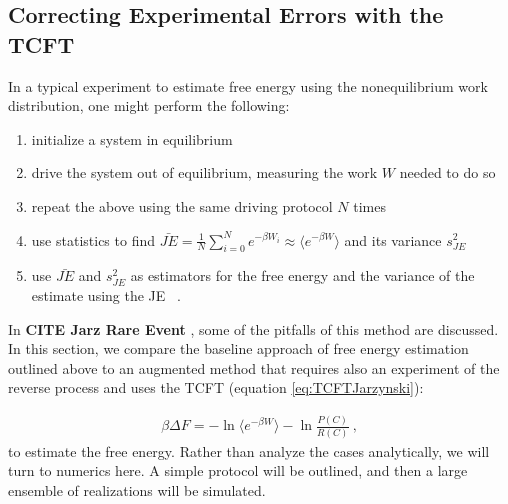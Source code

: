 \documentclass[paper=a4, fontsize=10pt]{article} %
\numberwithin{equation}{section} %
\numberwithin{figure}{section} %
\numberwithin{table}{section} %
\def\tbf #1{\textbf{#1} }
\def\avg#1{\langle #1 \rangle}
\begin{document}
\subsection{Correcting Experimental Errors with the TCFT}\label{sec:Corrections}

In a typical experiment to estimate free energy using the nonequilibrium work distribution, one might perform the following:
\begin{enumerate}
\item initialize a system in equilibrium
\item drive the system out of equilibrium, measuring the work $W$ needed to do so
\item repeat the above using the same driving protocol $N$ times
\item use statistics to find $ \bar{JE}  = \frac{1}{N} \sum_{i=0}^N e^{-\beta W_i} \approx \avg{e^{-\beta W}}$ and its variance $s^2_{JE}$
\item use $\bar{JE}$ and $s^2_{JE}$ as estimators for the free energy and the variance of the estimate using the JE
~.
\end{enumerate}

In \tbf{CITE Jarz Rare Event}, some of the pitfalls of this method are discussed. In this section, we compare the baseline approach of free energy estimation outlined above to an augmented method that requires also an experiment of the reverse process and uses the TCFT (equation \ref{eq:TCFTJarzynski}):

\begin{align}
\beta \Delta F = -\ln \avg{e^{-\beta W}} - \ln \frac{P(C)}{R(C)}
~,
\end{align}
to estimate the free energy. Rather than analyze the cases analytically, we will turn to numerics here. A simple protocol will be outlined, and then a large ensemble of realizations will be simulated.
\end{document}

